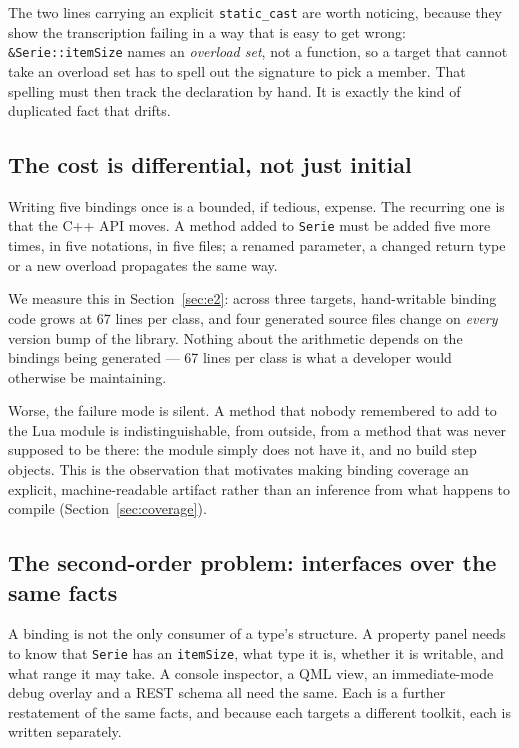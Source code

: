 \documentclass[11pt,a4paper]{article}
\newcommand{\code}[1]{\texttt{\small #1}}
\begin{document}
The two lines carrying an explicit \code{static\_cast} are worth noticing,
because they show the transcription failing in a way that is easy to get wrong:
\code{\&Serie::itemSize} names an \emph{overload set}, not a function, so a
target that cannot take an overload set has to spell out the signature to pick a
member. That spelling must then track the declaration by hand. It is exactly the
kind of duplicated fact that drifts.

\subsection{The cost is differential, not just initial}

Writing five bindings once is a bounded, if tedious, expense. The recurring one
is that the C++ API moves. A method added to \code{Serie} must be added five
more times, in five notations, in five files; a renamed parameter, a changed
return type or a new overload propagates the same way.

We measure this in Section~\ref{sec:e2}: across three targets, hand-writable binding
code grows at 67 lines per class, and four generated source files change on
\emph{every} version bump of the library. Nothing about the arithmetic depends
on the bindings being generated --- 67 lines per class is what a developer would
otherwise be maintaining.

Worse, the failure mode is silent. A method that nobody remembered to add to the
Lua module is indistinguishable, from outside, from a method that was never
supposed to be there: the module simply does not have it, and no build step
objects. This is the observation that motivates making binding coverage an
explicit, machine-readable artifact rather than an inference from what happens
to compile (Section~\ref{sec:coverage}).

\subsection{The second-order problem: interfaces over the same facts}

A binding is not the only consumer of a type's structure. A property panel needs
to know that \code{Serie} has an \code{itemSize}, what type it is, whether it is
writable, and what range it may take. A console inspector, a QML view, an
immediate-mode debug overlay and a REST schema all need the same. Each is a
further restatement of the same facts, and because each targets a different
toolkit, each is written separately.
\end{document}
